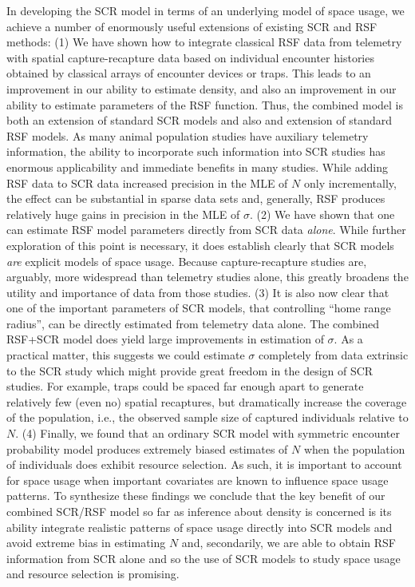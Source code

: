 \documentclass[12pt]{article}
\begin{document}
In developing the SCR model in terms of an underlying model of space
usage, we achieve a number of enormously useful extensions of existing
SCR and RSF methods:
(1) We have shown how to integrate classical RSF data from
telemetry with spatial capture-recapture data based on individual
encounter histories obtained by classical arrays of encounter devices
or traps. This leads to an improvement in our ability to estimate
density, and also an improvement in our ability to estimate parameters
of the RSF function.  Thus, the combined model is both an extension of
standard SCR models and also and extension of standard RSF models. As
many animal population studies have auxiliary telemetry information,
the ability to incorporate such information into SCR studies has
enormous applicability and immediate benefits in many studies.
While adding RSF data to SCR data increased precision in the MLE of $N$
only incrementally, the effect can be substantial in sparse data sets
and, generally, RSF produces
relatively huge gains in precision in the MLE of $\sigma$.
(2) We have shown that one can estimate RSF model parameters
directly from SCR data {\it alone}.
While further exploration of this point
is necessary,
it does establish clearly that SCR
models {\it are} explicit models of space usage. Because
capture-recapture studies are, arguably, more widespread than
telemetry studies alone, this greatly broadens the utility and
importance of data from those studies.
(3) It is also now clear
that one of the important parameters of SCR models, that controlling
``home range radius'', can be directly estimated from telemetry data 
alone.
The combined RSF+SCR model does yield large improvements in estimation
of $\sigma$. As a practical matter, this suggests we could estimate
$\sigma$ completely from data extrinsic to the SCR study which might
provide great freedom in the design of SCR studies. For example, traps
could be spaced far enough apart to generate relatively few (even no) spatial recaptures,
but dramatically increase the coverage of the population, i.e., the
observed sample size of captured individuals relative to $N$.
(4) Finally, we found that an
ordinary SCR model with symmetric encounter probability model produces
extremely biased estimates of $N$ when the population of individuals
does exhibit resource selection.  As such, it is important to account
for space usage when important covariates are known to influence
space usage patterns.
To synthesize these findings we conclude that
the key benefit of our combined SCR/RSF model so far as inference about density is
concerned is its ability
integrate realistic patterns of space usage directly into SCR models
and avoid extreme bias in estimating $N$ and, secondarily, we are able
to obtain RSF information from SCR alone and so the use of SCR models
to study space usage and resource selection is promising.
\end{document}
